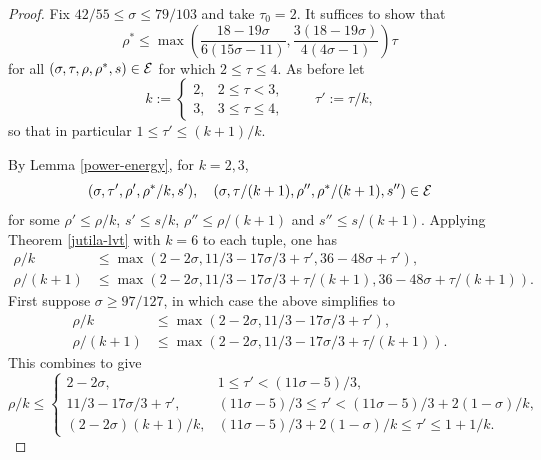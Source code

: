 \begin{proof}
Fix $42/55 \le \sigma \le 79/103$ and take $\tau_0 = 2$. It suffices to show that
\[
\rho^* \le \max\left(\frac{18 - 19\sigma}{6(15\sigma - 11)}, \frac{3(18-19\sigma)}{4(4\sigma-1)}\right)\tau
\]
for all $(\sigma, \tau, \rho, \rho^*, s) \in \mathcal{E}$ for which $2 \le \tau \le 4$. As before let
\[
k := \begin{cases}
2,& 2 \le \tau < 3,\\
3,& 3 \le \tau \le 4,
\end{cases}\qquad \tau' := \tau/k,
\]
so that in particular $1 \le \tau' \le (k + 1)/k$.

By Lemma \ref{power-energy}, for $k = 2, 3$,
\begin{equation}\label{ze-bound6-tuples}
(\sigma, \tau', \rho', \rho^*/k, s'),\quad (\sigma, \tau/(k + 1), \rho'', \rho^*/(k + 1), s'') \in \mathcal{E}
\end{equation}
for some $\rho' \le \rho/k$, $s' \le s/k$, $\rho'' \le \rho/(k + 1)$ and $s'' \le s/(k + 1)$.
Applying Theorem \ref{jutila-lvt} with $k = 6$ to each tuple, one has
\begin{equation}\label{ze-bound6-rho-bound}
\begin{split}
\rho/k &\le \max(2 - 2\sigma, 11/3 - 17\sigma/3 + \tau', 36 - 48\sigma + \tau'),\\
\rho/(k + 1) &\le \max(2 - 2\sigma, 11/3 - 17\sigma/3 + \tau/(k + 1), 36 - 48\sigma + \tau/(k + 1)).
\end{split}
\end{equation}
First suppose $\sigma \ge 97/127$, in which case the above simplifies to
\begin{align*}
\rho/k &\le \max(2 - 2\sigma, 11/3 - 17\sigma/3 + \tau'),\\
\rho/(k + 1) &\le \max(2 - 2\sigma, 11/3 - 17\sigma/3 + \tau/(k + 1)).
\end{align*}
This combines to give
\begin{equation}\label{ze-bound6-rho}
\rho/k \le \begin{cases}
2 - 2\sigma,&1 \le \tau' < (11\sigma - 5)/3,\\
11/3 - 17\sigma/3 + \tau',& (11\sigma - 5)/3 \le \tau' < (11\sigma - 5)/3 + 2(1 - \sigma)/k,\\
(2 - 2\sigma)(k + 1)/k,& (11\sigma - 5)/3 + 2(1 - \sigma)/k \le \tau' \le 1 + 1/k.
\end{cases}
\end{equation}


\end{proof}
